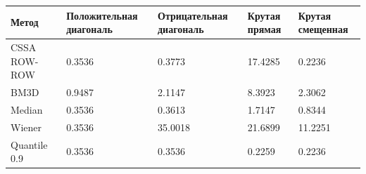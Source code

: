 \begin{tabular}{|l|l|l|l|l|}
\hline
Метод & Положительная диагональ & Отрицательная диагональ & Крутая прямая & Крутая смещенная \\
\hline
CSSA ROW-ROW & 0.3536 & 0.3773 & 17.4285 & 0.2236 \\
\hline
BM3D & 0.9487 & 2.1147 & 8.3923 & 2.3062 \\
\hline
Median & 0.3536 & 0.3613 & 1.7147 & 0.8344 \\
\hline
Wiener & 0.3536 & 35.0018 & 21.6899 & 11.2251 \\
\hline
Quantile 0.9 & 0.3536 & 0.3536 & 0.2259 & 0.2236 \\
\hline
\end{tabular}
